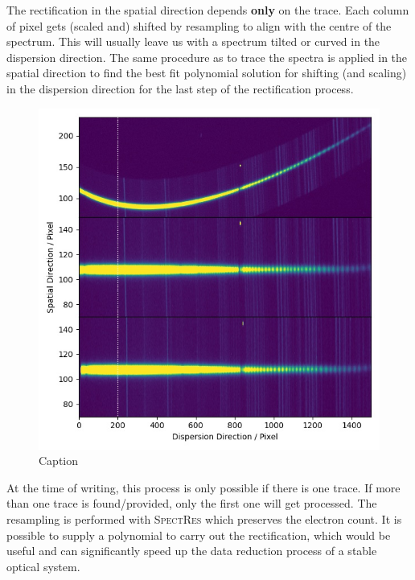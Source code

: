 \documentclass[fleqn,usenatbib]{mnras}
\begin{document}
The rectification in the spatial direction depends \textbf{only}
on the trace. Each column of pixel gets (scaled and) shifted by
resampling to align with the centre of the spectrum. This will
usually leave us with a spectrum tilted or curved in the dispersion
direction. The same procedure as to trace the spectra is applied
in the spatial direction to find the best fit polynomial solution
for shifting (and scaling) in the dispersion direction for the
last step of the rectification process.

\begin{figure}
    \centering
    \includegraphics[width=\columnwidth]{fig_02_rectification.jpg}
    \caption{Caption}
    \label{fig:rectify}
\end{figure}

At the time of writing, this process is only possible if there is
one trace. If more than one trace is found/provided, only the first
one will get processed. The resampling is performed with
\textsc{SpectRes} which preserves the electron count. It is possible
to supply a polynomial to carry out the rectification, which would
be useful and can significantly speed up the data reduction process
of a stable optical system.
\end{document}
